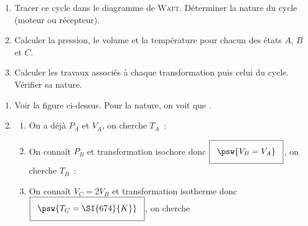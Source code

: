 \documentclass[../../main/main.tex]{subfiles}
\begin{document}
\begin{tcb*}[breakable]
\begin{isd}[righthand ratio=.40]
\begin{center}
{			}
		\end{center}
	\end{isd}
	\begin{enumerate}[label=\sqenumi]
		\item Tracer ce cycle dans le diagramme de \textsc{Watt}. Déterminer la
		      nature du cycle (moteur ou récepteur).
		\item Calculer la pression, le volume et la température pour chacun des
		      états $A$, $B$ et $C$.
		\item Calculer les travaux associés à chaque transformation puis celui du
		      cycle. Vérifier sa nature.
	\end{enumerate}
	\tcblower
	\begin{enumerate}[label=\sqenumi]
		\item Voir la figure ci-dessus. Pour la nature, on voit que
		      .
		\item
		      \begin{enumerate}[label=\clalphi]
			      \item On a déjà $P_A$ et $V_A$, on cherche $T_A$~:
			            \psw{%
				            \[
					            \boxed{T_A = \frac{P_AV_A}{nR}}
					            \Ra
					            \xul{T_A = \SI{337}{K}}
					            \qav
					            \left\{
					            \begin{array}{rcl}
						            P_A & = & \SI{2e5}{Pa}
						            \\
						            V_A & = & \SI{1.4e-2}{m^3}
						            \\
						            n   & = & \SI{1}{mol}
						            \\
						            R   & = & \SI{8.314}{J.K^{-1}.mol^{-1}}
					            \end{array}
					            \right.
				            \]
			            }%
			      \item On connaît $P_B$ et transformation isochore donc
			            $\setlength{\fboxsep}{3mm}\boxed{\psw{V_B = V_A}}$, on cherche $T_B$~:
			            \psw{%
				            \[
					            \boxed{T_B = \frac{P_BV_B}{nR}}
					            \Ra
					            \xul{T_B = \SI{674}{K}}
				            \]
			            }%
			      \item On connaît $V_C = 2V_B$ et transformation isotherme donc
			            $\setlength{\fboxsep}{3mm}\boxed{\psw{T_C = \SI{674}{K}}}$, on cherche

\end{enumerate}
\end{enumerate}
\end{tcb*}
\end{document}
